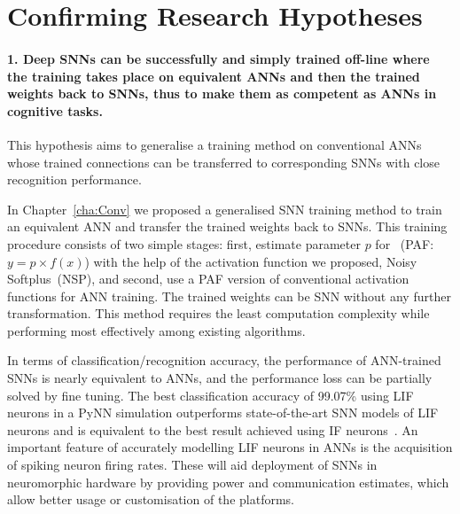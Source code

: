 \section{Confirming Research Hypotheses}
\paragraph{1. Deep SNNs can be successfully and simply trained off-line where the training takes place on equivalent ANNs and then \DIFdelbegin {}\DIFdelend the trained weights \DIFaddbegin {}\DIFaddend back to \DIFaddbegin {}\DIFaddend SNNs, thus to make them as competent as \DIFaddbegin {}\DIFaddend ANNs in cognitive tasks.}
This hypothesis aims to generalise a training method on conventional ANNs whose trained connections can be transferred to corresponding SNNs with close recognition performance.

In Chapter~\ref{cha:Conv} we proposed a generalised SNN training method to train an equivalent ANN and transfer the trained weights back to SNNs.
This training procedure consists of two simple stages: first, estimate parameter $p$ for \DIFdelbegin {}\DIFdelend \DIFaddbegin {}\DIFaddend ~(PAF: $y = p \times f(x)$) with the help of the activation function we proposed, Noisy Softplus~(NSP), and second, use a PAF version of \DIFaddbegin {}\DIFaddend conventional activation functions for ANN training. %
The trained weights can be \DIFdelbegin {}\DIFdelend \DIFaddbegin {}\DIFaddend SNN without any further transformation.
This method requires the least computation complexity while performing most effectively among existing algorithms.

In terms of classification/recognition accuracy, the performance of ANN-trained SNNs is nearly equivalent to ANNs, and the performance loss can be partially solved by fine tuning.
The best classification accuracy of 99.07\% using LIF neurons in a PyNN simulation outperforms state-of-the-art SNN models of LIF neurons and is equivalent to the best result achieved using IF neurons~\DIFdelbegin {}\DIFdelend \DIFaddbegin {}\DIFaddend .
An important feature of accurately modelling LIF neurons in ANNs is the acquisition of spiking neuron firing rates. These will aid deployment of SNNs in neuromorphic hardware by providing power and communication estimates, which \DIFdelbegin {}\DIFdelend allow better usage or customisation of the platforms.

